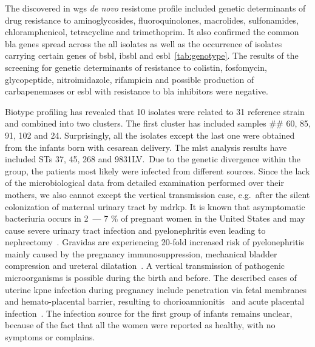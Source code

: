 \documentclass[12pt,a4paper]{article}
\begin{document}
The discovered in \gls{wgs} \textit{de novo} resistome profile included genetic determinants of drug resistance to
aminoglycosides, fluoroquinolones, macrolides, sulfonamides, chloramphenicol, tetracycline and trimethoprim.
It also confirmed the common \gls{bla} genes spread across the all isolates as well as the occurrence of isolates
carrying certain genes of \gls{bsbl}, \gls{ibsbl} and \gls{esbl}~\ref{tab:genotype}.
The results of the screening for genetic determinants of resistance to colistin, fosfomycin, glycopeptide,
nitroimidazole, rifampicin and possible production of carbapenemases or \gls{esbl} with resistance to \glsdesc{bla}
inhibitors were negative.

Biotype profiling has revealed that 10 isolates were related to 31 reference strain and combined into two clusters.
The first cluster has included samples \#\# 60, 85, 91, 102 and 24.
Surprisingly, all the isolates except the last one were obtained from the infants born with cesarean delivery.
The \gls{mlst} analysis results have included STs 37, 45, 268 and 983\-1LV.\
Due to the genetic divergence within the group, the patients most likely were infected from different sources.
Since the lack of the microbiological data from detailed examination performed over their mothers, we also cannot except
the vertical transmission case, e.g.\ after the silent colonization of maternal urinary tract by \gls{mdrkp}.
It is known that asymptomatic bacteriuria occurs in 2~--- 7 \% of pregnant women in the United States
and may cause severe urinary tract infection and pyelonephritis even leading to nephrectomy~\cite{Kim2018}.
Gravidas are experiencing 20-fold increased risk of pyelonephritis mainly caused by the pregnancy immunosuppression,
mechanical bladder compression and ureteral dilatation~\cite{Farkash2012}.
A vertical transmission of pathogenic microorganisms is possible during the birth and before.
The described cases of uterine \gls{kpne} infection during pregnancy include penetration via fetal membranes and
hemato-placental barrier, resulting to chorioamnionitis~\cite{Oh2017} and acute placental infection~\cite{Sheikh2005}.
The infection source for the first group of infants remains unclear, because of the fact that all the women
were reported as healthy, with no symptoms or complains.
\end{document}
